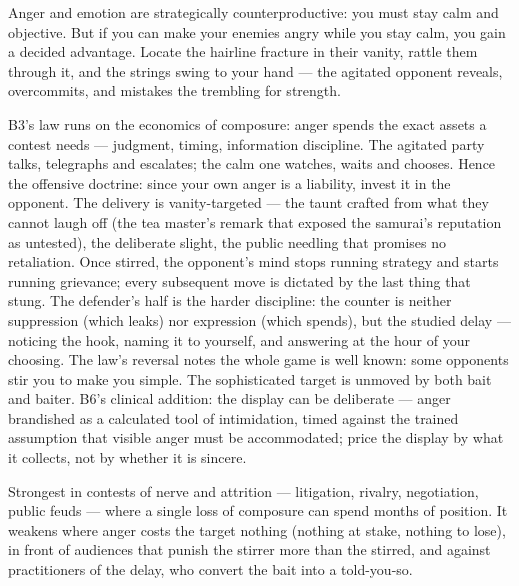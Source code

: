 \begin{core}
Anger and emotion are strategically counterproductive: you must stay calm and objective. But if you can make your enemies angry while you stay calm, you gain a decided advantage. Locate the hairline fracture in their vanity, rattle them through it, and the strings swing to your hand --- the agitated opponent reveals, overcommits, and mistakes the trembling for strength.
\end{core}
\begin{mechanism}
B3's law runs on the economics of composure: anger spends the exact assets a contest needs --- judgment, timing, information discipline. The agitated party talks, telegraphs and escalates; the calm one watches, waits and chooses. Hence the offensive doctrine: since your own anger is a liability, invest it in the opponent. The delivery is vanity-targeted --- the taunt crafted from what they cannot laugh off (the tea master's remark that exposed the samurai's reputation as untested), the deliberate slight, the public needling that promises no retaliation. Once stirred, the opponent's mind stops running strategy and starts running grievance; every subsequent move is dictated by the last thing that stung. The defender's half is the harder discipline: the counter is neither suppression (which leaks) nor expression (which spends), but the studied delay --- noticing the hook, naming it to yourself, and answering at the hour of your choosing. The law's reversal notes the whole game is well known: some opponents stir you to make you simple. The sophisticated target is unmoved by both bait and baiter. B6's clinical addition: the display can be deliberate --- anger brandished as a calculated tool of intimidation, timed against the trained assumption that visible anger must be accommodated; price the display by what it collects, not by whether it is sincere.
\end{mechanism}
\begin{conditions}
Strongest in contests of nerve and attrition --- litigation, rivalry, negotiation, public feuds --- where a single loss of composure can spend months of position. It weakens where anger costs the target nothing (nothing at stake, nothing to lose), in front of audiences that punish the stirrer more than the stirred, and against practitioners of the delay, who convert the bait into a told-you-so.
\end{conditions}
